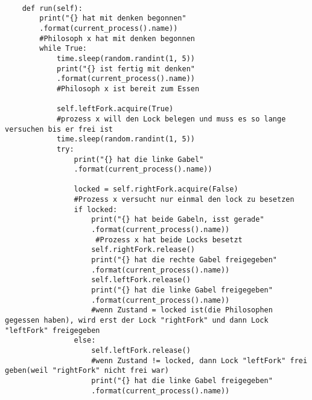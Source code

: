 \begin{lstlisting}[style = Python, label = {endloesung}, caption = {Endlösung}]

    def run(self):
        print("{} hat mit denken begonnen"
        .format(current_process().name)) 
        #Philosoph x hat mit denken begonnen
        while True:
            time.sleep(random.randint(1, 5))
            print("{} ist fertig mit denken"
            .format(current_process().name)) 
            #Philosoph x ist bereit zum Essen

            self.leftFork.acquire(True) 
            #prozess x will den Lock belegen und muss es so lange versuchen bis er frei ist
            time.sleep(random.randint(1, 5))
            try:
                print("{} hat die linke Gabel"
                .format(current_process().name))

                locked = self.rightFork.acquire(False) 
                #Prozess x versucht nur einmal den lock zu besetzen
                if locked:
                    print("{} hat beide Gabeln, isst gerade"
                    .format(current_process().name)) 
                     #Prozess x hat beide Locks besetzt
                    self.rightFork.release() 
                    print("{} hat die rechte Gabel freigegeben"
                    .format(current_process().name)) 
                    self.leftFork.release() 
                    print("{} hat die linke Gabel freigegeben"
                    .format(current_process().name))
                    #wenn Zustand = locked ist(die Philosophen gegessen haben), wird erst der Lock "rightFork" und dann Lock "leftFork" freigegeben
                else:
                    self.leftFork.release() 
                    #wenn Zustand != locked, dann Lock "leftFork" frei geben(weil "rightFork" nicht frei war)
                    print("{} hat die linke Gabel freigegeben"
                    .format(current_process().name))  

\end{lstlisting}






